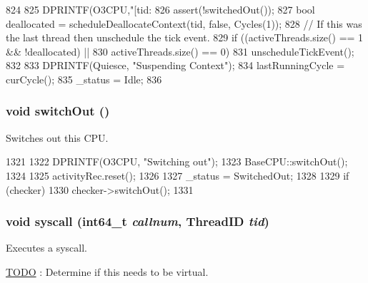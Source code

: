 \begin{DoxyCode}
824 {
825     DPRINTF(O3CPU,"[tid: %
826     assert(!switchedOut());
827     bool deallocated = scheduleDeallocateContext(tid, false, Cycles(1));
828     // If this was the last thread then unschedule the tick event.
829     if ((activeThreads.size() == 1 && !deallocated) ||
830         activeThreads.size() == 0)
831         unscheduleTickEvent();
832 
833     DPRINTF(Quiesce, "Suspending Context\n");
834     lastRunningCycle = curCycle();
835     _status = Idle;
836 }
\end{DoxyCode}
\hypertarget{classFullO3CPU_a05f299b443f8cc73a93d61572edc0218}{
\subsubsection[{switchOut}]{\setlength{\rightskip}{0pt plus 5cm}void switchOut ()}}
\label{classFullO3CPU_a05f299b443f8cc73a93d61572edc0218}
Switches out this CPU. 


\begin{DoxyCode}
1321 {
1322     DPRINTF(O3CPU, "Switching out\n");
1323     BaseCPU::switchOut();
1324 
1325     activityRec.reset();
1326 
1327     _status = SwitchedOut;
1328 
1329     if (checker)
1330         checker->switchOut();
1331 }
\end{DoxyCode}
\hypertarget{classFullO3CPU_a2d6a2bbae85e604392f43b3418cdec97}{
\subsubsection[{syscall}]{\setlength{\rightskip}{0pt plus 5cm}void syscall (int64\_\-t {\em callnum}, \/  {\bf ThreadID} {\em tid})}}
\label{classFullO3CPU_a2d6a2bbae85e604392f43b3418cdec97}
Executes a syscall. \begin{Desc}
\item[\hyperlink{todo__todo000027}{TODO}]: Determine if this needs to be virtual. \end{Desc}



